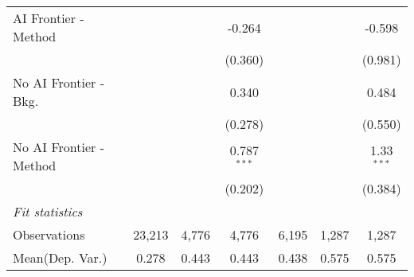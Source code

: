 \begin{tabular}{lcccccc}
   AI Frontier - Method    &              &               & -0.264        &             &              & -0.598\\   
                           &              &               & (0.360)       &             &              & (0.981)\\   
   No AI Frontier - Bkg.   &              &               & 0.340         &             &              & 0.484\\   
                           &              &               & (0.278)       &             &              & (0.550)\\   
   No AI Frontier - Method &              &               & 0.787$^{***}$ &             &              & 1.33$^{***}$\\   
                           &              &               & (0.202)       &             &              & (0.384)\\   
   \midrule
   \emph{Fit statistics}\\
   Observations            & 23,213       & 4,776         & 4,776         & 6,195       & 1,287        & 1,287\\  
Mean(Dep. Var.) & 0.278 & 0.443 & 0.443 & 0.438 & 0.575 & 0.575 \\
   

\end{tabular}
